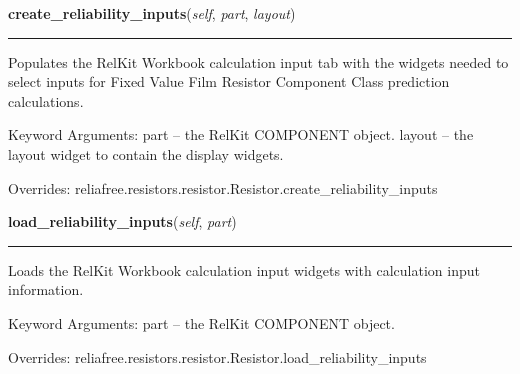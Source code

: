     \vspace{0.5ex}

\hspace{.8\funcindent}\begin{boxedminipage}{\funcwidth}

    \raggedright \textbf{create\_reliability\_inputs}(\textit{self}, \textit{part}, \textit{layout})

    \vspace{-1.5ex}

    \rule{\textwidth}{0.5\fboxrule}
\setlength{\parskip}{2ex}
    Populates the RelKit Workbook calculation input tab with the widgets
    needed to select inputs for Fixed Value Film Resistor Component Class 
    prediction calculations.

    Keyword Arguments: part   -- the RelKit COMPONENT object. layout -- 
    the layout widget to contain the display widgets.

\setlength{\parskip}{1ex}
      Overrides: reliafree.resistors.resistor.Resistor.create\_reliability\_inputs

    \end{boxedminipage}

    \vspace{0.5ex}

\hspace{.8\funcindent}\begin{boxedminipage}{\funcwidth}

    \raggedright \textbf{load\_reliability\_inputs}(\textit{self}, \textit{part})

    \vspace{-1.5ex}

    \rule{\textwidth}{0.5\fboxrule}
\setlength{\parskip}{2ex}
    Loads the RelKit Workbook calculation input widgets with calculation
    input information.

    Keyword Arguments: part -- the RelKit COMPONENT object.

\setlength{\parskip}{1ex}
      Overrides: reliafree.resistors.resistor.Resistor.load\_reliability\_inputs

    \end{boxedminipage}

    \label{reliafree:resistors:fixed:Film:calculate_mil_217_count}

